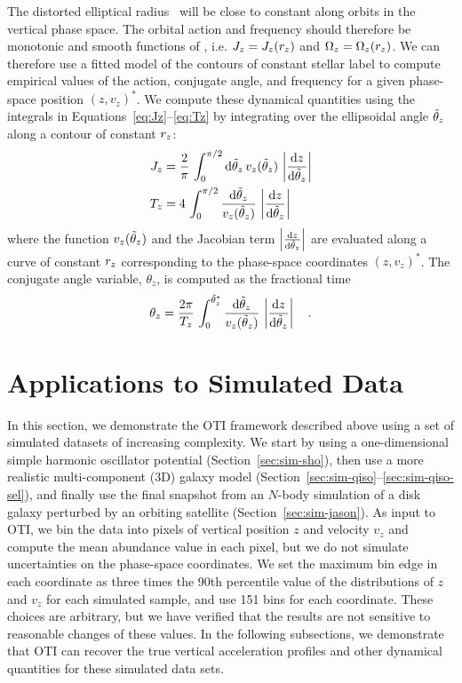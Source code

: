 The distorted elliptical radius \rz\ will be close to constant along orbits in the
vertical phase space.
The orbital action and frequency should therefore be monotonic and smooth functions of
\rz, i.e. $J_z = J_z(r_z)$ and $\Omega_z = \Omega_z(r_z)$.
We can therefore use a fitted model of the contours of constant stellar label to compute
empirical values of the action, conjugate angle, and frequency for a given phase-space
position $(z, v_z)^*$.
We compute these dynamical quantities using the integrals in
Equations~\ref{eq:Jz}--\ref{eq:Tz} by integrating over the ellipsoidal angle $\tilde{\theta}_z$
along a contour of constant $r_z$:
\begin{align}
    J_z &= \frac{2}{\pi} \, \int_0^{\pi/2} \mathrm{d} \tilde{\theta}_z \, v_z(\tilde{\theta}_z)
        \, \left|\frac{\mathrm{d} z}{\mathrm{d} \tilde{\theta}_z}\right| \label{eq:Jz-ell} \\
    T_z &= 4 \, \int_0^{\pi/2} \frac{\mathrm{d} \tilde{\theta}_z}{v_z(\tilde{\theta}_z)}
        \, \left|\frac{\mathrm{d} z}{\mathrm{d} \tilde{\theta}_z}\right| \label{eq:Tz-ell}
\end{align}
where the function $v_z(\tilde{\theta}_z)$ and the Jacobian term $\left|\frac{\mathrm{d} z}{\mathrm{d}
\tilde{\theta}_z}\right|$ are evaluated along a curve of constant $r_z$ corresponding to the
phase-space coordinates $(z, v_z)^*$.
The conjugate angle variable, $\theta_z$, is computed as the fractional time
\begin{equation}
    \theta_z = \frac{2\pi}{T_z} \, \int_0^{\tilde{\theta}_z^*} \frac{\mathrm{d} \tilde{\theta}_z}{v_z(\tilde{\theta}_z)}
        \, \left|\frac{\mathrm{d} z}{\mathrm{d} \tilde{\theta}_z}\right| \label{eq:thz-ell} \quad .
\end{equation}

\section{Applications to Simulated Data} \label{sec:applications-sim}


In this section, we demonstrate the OTI framework described above using a set of
simulated datasets of increasing complexity.
We start by using a one-dimensional simple harmonic oscillator potential
(Section~\ref{sec:sim-sho}), then use a more realistic multi-component (3D) galaxy model
(Section~\ref{sec:sim-qiso}--\ref{sec:sim-qiso-sel}), and finally use the final snapshot
from an $N$-body simulation of a disk galaxy perturbed by an orbiting satellite
(Section~\ref{sec:sim-jason}).
As input to OTI, we bin the data into pixels of vertical position $z$ and velocity $v_z$
and compute the mean abundance value in each pixel, but we do not simulate uncertainties
on the phase-space coordinates.
We set the maximum bin edge in each coordinate as three times the 90th percentile value
of the distributions of $z$ and $v_z$ for each simulated sample, and use 151 bins for
each coordinate.
These choices are arbitrary, but we have verified that the results are not sensitive to
reasonable changes of these values.
In the following subsections, we demonstrate that OTI can recover the true vertical
acceleration profiles and other dynamical quantities for these simulated data sets.

